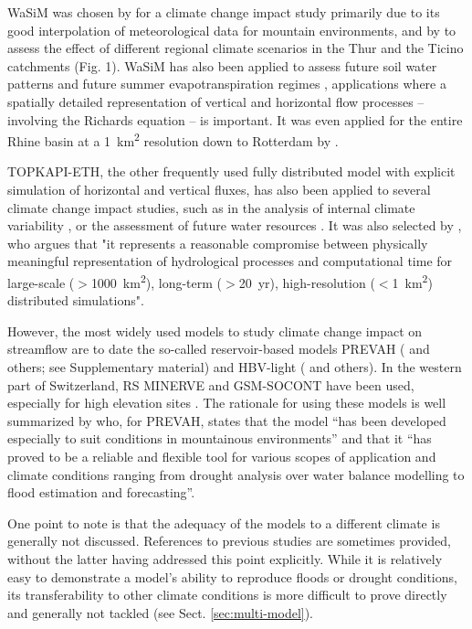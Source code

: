 \documentclass[10pt,a4paper]{article}
\begin{document}
WaSiM was chosen by \citet{Middelkoop2001} for a climate change impact study primarily due to its good interpolation of meteorological data for mountain environments, and by \citet{Jasper2004} to assess the effect of different regional climate scenarios in the Thur and the Ticino catchments (Fig. 1). WaSiM has also been applied to assess future soil water patterns \citep{Jasper2006, Rossler2012} and future summer evapotranspiration regimes \citep{Calanca2006}, applications where a spatially detailed representation of vertical and horizontal flow processes -- involving the Richards equation -- is important. It was even applied for the entire Rhine basin at a 1~km\textsuperscript{2} resolution down to Rotterdam by \citet{Kleinn2005}.

TOPKAPI-ETH, the other frequently used fully distributed model with explicit simulation of horizontal and vertical fluxes, has also been applied to several climate change impact studies, such as in the analysis of internal climate variability \citep{Fatichi2014}, or the assessment of future water resources \citep{Finger2012}. It was also selected by \citet{Fatichi2015}, who argues that "it represents a reasonable compromise between physically meaningful representation of hydrological processes and computational time for large-scale ($>$1000~km\textsuperscript{2}), long-term ($>$20~yr), high-resolution ($<$1~km\textsuperscript{2}) distributed simulations".

However, the most widely used models to study climate change impact on streamflow are to date the so-called reservoir-based models PREVAH (\citealt{Koplin2012, Speich2015, Milano2015a, Brunner2019c} and others;  see Supplementary material) and HBV-light (\citealt{Etter2017, Hakala2020, Brunner2018a, Jenicek2018}  and others). In the western part of Switzerland, RS MINERVE and GSM-SOCONT have been used, especially for high elevation sites \citep{Horton2006, Uhlmann2013a, Uhlmann2013b, Terrier2015}. The rationale for using these models is well summarized by \citet{Koplin2010} who, for PREVAH, states that the model ``has been developed especially to suit conditions in mountainous environments'' and that it ``has proved to be a reliable and flexible tool for various scopes of application and climate conditions ranging from drought analysis over water balance modelling to flood estimation and forecasting''. 

One point to note is that the adequacy of the models to a different climate is generally not discussed. References to previous studies are sometimes provided, without the latter having addressed this point explicitly. While it is relatively easy to demonstrate a model's ability to reproduce floods or drought conditions, its transferability to other climate conditions is more difficult to prove directly and generally not tackled (see Sect. \ref{sec:multi-model}). 
\end{document}
